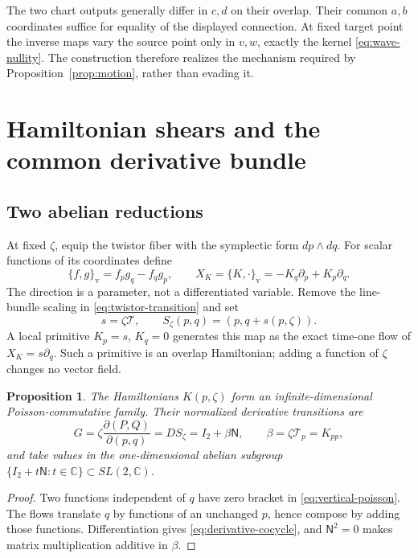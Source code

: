 \documentclass[11pt]{article}
\numberwithin{equation}{section}
\newtheorem{proposition}[theorem]{Proposition}
\theoremstyle{definition}
\theoremstyle{remark}
\newcommand{\C}{\mathbb C}
\newcommand{\NN}{\mathsf N}
\newcommand{\II}{I_2}
\newcommand{\calT}{\mathcal T}
\begin{document}
The two chart outputs generally differ in $c,d$ on their overlap. Their common $a,b$ coordinates suffice for equality of the displayed connection. At fixed target point the inverse maps vary the source point only in $v,w$, exactly the kernel \eqref{eq:wave-nullity}. The construction therefore realizes the mechanism required by Proposition~\ref{prop:motion}, rather than evading it.

\section{Hamiltonian shears and the common derivative bundle}\label{sec:shear}

\subsection{Two abelian reductions}

At fixed $\zeta$, equip the twistor fiber with the symplectic form $dp\wedge dq$. For scalar functions of its coordinates define
\begin{equation}\label{eq:vertical-poisson}
\{f,g\}_{\mathrm v}=f_pg_q-f_qg_p,
\qquad X_K=\{K,\cdot\}_{\mathrm v}=-K_q\partial_p+K_p\partial_q.
\end{equation}
The direction is a parameter, not a differentiated variable. Remove the line-bundle scaling in \eqref{eq:twistor-transition} and set
\begin{equation}\label{eq:normalized-shear}
s=\zeta\calT,\qquad S_\zeta(p,q)=(p,q+s(p,\zeta)).
\end{equation}
A local primitive $K_p=s$, $K_q=0$ generates this map as the exact time-one flow of $X_K=s\partial_q$. Such a primitive is an overlap Hamiltonian; adding a function of $\zeta$ changes no vector field.

\begin{proposition}\label{prop:abelian}
The Hamiltonians $K(p,\zeta)$ form an infinite-dimensional Poisson-commutative family. Their normalized derivative transitions are
\begin{equation}\label{eq:derivative-cocycle}
G=\zeta\frac{\partial(P,Q)}{\partial(p,q)}
=DS_\zeta=\II+\beta\NN,
\qquad \beta=\zeta\calT_p=K_{pp},
\end{equation}
and take values in the one-dimensional abelian subgroup $\{\II+t\NN:t\in\C\}\subset SL(2,\C)$.
\end{proposition}
\begin{proof}
Two functions independent of $q$ have zero bracket in \eqref{eq:vertical-poisson}. The flows translate $q$ by functions of an unchanged $p$, hence compose by adding those functions. Differentiation gives \eqref{eq:derivative-cocycle}, and $\NN^2=0$ makes matrix multiplication additive in $\beta$.
\end{proof}
\end{document}
